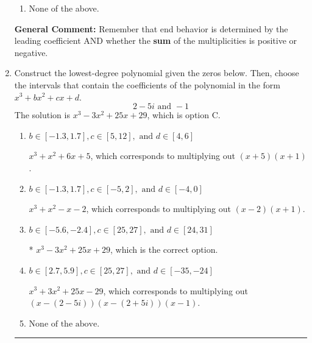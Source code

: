 \documentclass{extbook}[14pt]
\newcommand{\litem}[1]{\item #1

\rule{\textwidth}{0.4pt}}
\begin{document}
\begin{enumerate}
{\begin{enumerate}[label=\Alph*.]
\item None of the above.\end{enumerate}
\textbf{General Comment:} Remember that end behavior is determined by the leading coefficient AND whether the \textbf{sum} of the multiplicities is positive or negative.
}
\litem{
Construct the lowest-degree polynomial given the zeros below. Then, choose the intervals that contain the coefficients of the polynomial in the form $x^3+bx^2+cx+d$.
\[ 2 - 5 i \text{ and } -1 \]The solution is \( x^{3} -3 x^{2} +25 x + 29 \), which is option C.\begin{enumerate}[label=\Alph*.]
\item \( b \in [-1.3, 1.7], c \in [5, 12], \text{ and } d \in [4, 6] \)

$x^{3} + x^{2} +6 x + 5$, which corresponds to multiplying out $(x + 5)(x + 1)$.
\item \( b \in [-1.3, 1.7], c \in [-5, 2], \text{ and } d \in [-4, 0] \)

$x^{3} + x^{2} -x -2$, which corresponds to multiplying out $(x -2)(x + 1)$.
\item \( b \in [-5.6, -2.4], c \in [25, 27], \text{ and } d \in [24, 31] \)

* $x^{3} -3 x^{2} +25 x + 29$, which is the correct option.
\item \( b \in [2.7, 5.9], c \in [25, 27], \text{ and } d \in [-35, -24] \)

$x^{3} +3 x^{2} +25 x -29$, which corresponds to multiplying out $(x-(2 - 5 i))(x-(2 + 5 i))(x -1)$.
\item \( \text{None of the above.} \)


\end{enumerate}}
\end{enumerate}
\end{document}
